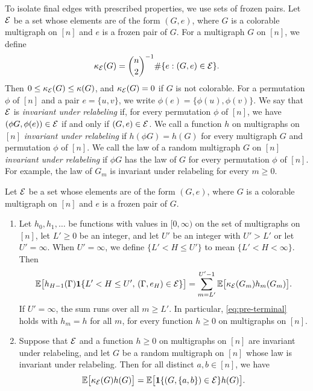 To isolate final edges with prescribed properties, we use sets of frozen pairs. Let $\mathcal E$ be a set whose elements are of the form $(G, e)$, where $G$ is a colorable multigraph on $[n]$ and $e$ is a frozen pair of $G$. For a multigraph $G$ on $[n]$, we define
\begin{equation}\label{eq:pre-kappaE}
\kappa_{\mathcal E}(G) = \binom{n}{2}^{-1} \#\{e : (G, e) \in \mathcal E\}.
\end{equation}
Then $0 \le \kappa_{\mathcal E}(G) \le \kappa(G)$, and $\kappa_{\mathcal E}(G) = 0$ if $G$ is not colorable. For a permutation $\phi$ of $[n]$ and a pair $e = \{u, v\}$, we write $\phi(e) = \{\phi(u), \phi(v)\}$. We say that $\mathcal E$ is \emph{invariant under relabeling} if, for every permutation $\phi$ of $[n]$, we have $(\phi G, \phi(e)) \in \mathcal E$ if and only if $(G, e) \in \mathcal E$. We call a function $h$ on multigraphs on $[n]$ \emph{invariant under relabeling} if $h(\phi G) = h(G)$ for every multigraph $G$ and permutation $\phi$ of $[n]$. We call the law of a random multigraph $G$ on $[n]$ \emph{invariant under relabeling} if $\phi G$ has the law of $G$ for every permutation $\phi$ of $[n]$. For example, the law of $G_m$ is invariant under relabeling for every $m \ge 0$.

\begin{lemma}\label{lem:pre-terminal}
Let $\mathcal E$ be a set whose elements are of the form $(G, e)$, where $G$ is a colorable multigraph on $[n]$ and $e$ is a frozen pair of $G$.
\begin{enumerate}[label=(\alph*)]
\item Let $h_0, h_1, \dots$ be functions with values in $[0, \infty)$ on the set of multigraphs on $[n]$, let $L' \ge 0$ be an integer, and let $U'$ be an integer with $U' > L'$ or let $U' = \infty$. When $U' = \infty$, we define $\{L' < H \le U'\}$ to mean $\{L' < H < \infty\}$. Then
\begin{equation}\label{eq:pre-terminal}
\mathbb E\big[h_{H - 1}(\Gamma) \mathbf 1\{L' < H \le U', \, (\Gamma, e_H) \in \mathcal E\}\big] = \sum_{m = L'}^{U' - 1} \mathbb E\big[\kappa_{\mathcal E}(G_m) h_m(G_m)\big].
\end{equation}
If $U' = \infty$, the sum runs over all $m \ge L'$. In particular, \eqref{eq:pre-terminal} holds with $h_m = h$ for all $m$, for every function $h \ge 0$ on multigraphs on $[n]$.
\item Suppose that $\mathcal E$ and a function $h \ge 0$ on multigraphs on $[n]$ are invariant under relabeling, and let $G$ be a random multigraph on $[n]$ whose law is invariant under relabeling. Then for all distinct $a, b \in [n]$, we have
\begin{equation}\label{eq:pre-fixed-pair}
\mathbb E\big[\kappa_{\mathcal E}(G) h(G)\big] = \mathbb E\big[\mathbf 1\{(G, \{a, b\}) \in \mathcal E\} h(G)\big].
\end{equation}
\end{enumerate}
\end{lemma}

